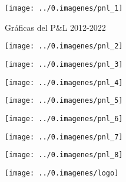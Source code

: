 \begin{rightcolumn}

\begin{figure}[H]
\caption{Gráficas del P\&L 2012-2022}
\texttt{[image: ../0.imagenes/pnl\_1]}
\end{figure} 

\begin{figure}[H]

\texttt{[image: ../0.imagenes/pnl\_2]}
\end{figure} 

\begin{figure}[H]

\texttt{[image: ../0.imagenes/pnl\_3]}
\end{figure} 

\begin{figure}[H]

\texttt{[image: ../0.imagenes/pnl\_4]}
\end{figure} 

\begin{figure}[H]

\texttt{[image: ../0.imagenes/pnl\_5]}
\end{figure} 

\begin{figure}[H]

\texttt{[image: ../0.imagenes/pnl\_6]}
\end{figure} 

\begin{figure}[H]

\texttt{[image: ../0.imagenes/pnl\_7]}
\end{figure} 

\begin{figure}[H]

\texttt{[image: ../0.imagenes/pnl\_8]}
\end{figure} 

\begin{figure}[H]

\texttt{[image: ../0.imagenes/logo]}
\end{figure} 


\end{rightcolumn}